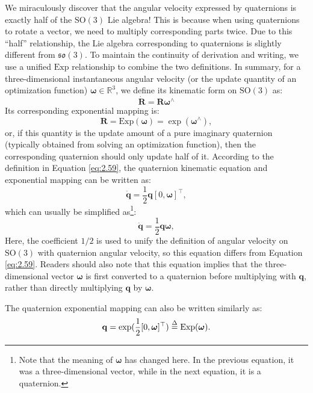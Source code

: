 We miraculously discover that the angular velocity expressed by quaternions is exactly half of the $\mathrm{SO}(3)$ Lie algebra! This is because when using quaternions to rotate a vector, we need to multiply corresponding parts twice. Due to this ``half'' relationship, the Lie algebra corresponding to quaternions is slightly different from $\mathfrak{so}(3)$. To maintain the continuity of derivation and writing, we use a unified $\mathrm{Exp}$ relationship to combine the two definitions. In summary, for a three-dimensional instantaneous angular velocity (or the update quantity of an optimization function) $\boldsymbol{\omega} \in \mathbb{R}^3$, we define its kinematic form on $\mathrm{SO}(3)$ as:
\begin{equation}\label{eq:rotation-matrix-kinematics}
	\dot{\mathbf{R}} = \mathbf{R} \boldsymbol{\omega}^\wedge
\end{equation}
Its corresponding exponential mapping is:
\begin{equation}\label{key}
	\mathbf{R} = \mathrm{Exp} (\boldsymbol{\omega}) = \exp(\boldsymbol{\omega}^\wedge),
\end{equation}
or, if this quantity is the update amount of a pure imaginary quaternion (typically obtained from solving an optimization function), then the corresponding quaternion should only update half of it. According to the definition in Equation \eqref{eq:2.59}, the quaternion kinematic equation and exponential mapping can be written as:
\begin{equation}\label{eq:quaternion-kinematics}
	\dot{\mathbf{q}} = \frac{1}{2} \mathbf{q} [0, \boldsymbol{\omega}]^\top,
\end{equation}
which can usually be simplified as\footnote{Note that the meaning of $\boldsymbol{\omega}$ has changed here. In the previous equation, it was a three-dimensional vector, while in the next equation, it is a quaternion.}:
\begin{equation}
	\dot{\mathbf{q}} = \frac{1}{2} \mathbf{q} \boldsymbol{\omega},
\end{equation}
Here, the coefficient $1/2$ is used to unify the definition of angular velocity on $\mathrm{SO}(3)$ with quaternion angular velocity, so this equation differs from Equation \eqref{eq:2.59}. Readers should also note that this equation implies that the three-dimensional vector $\boldsymbol{\omega}$ is first converted to a quaternion before multiplying with $\mathbf{q}$, rather than directly multiplying $\mathbf{q}$ by $\boldsymbol{\omega}$.

The quaternion exponential mapping can also be written similarly as:
\begin{equation}\label{key}
	\mathbf{q} = \exp(\frac{1}{2} [0, \boldsymbol{\omega}]^\top) \buildrel \Delta \over = 
	\mathrm{Exp}(\boldsymbol{\omega}).
\end{equation}

